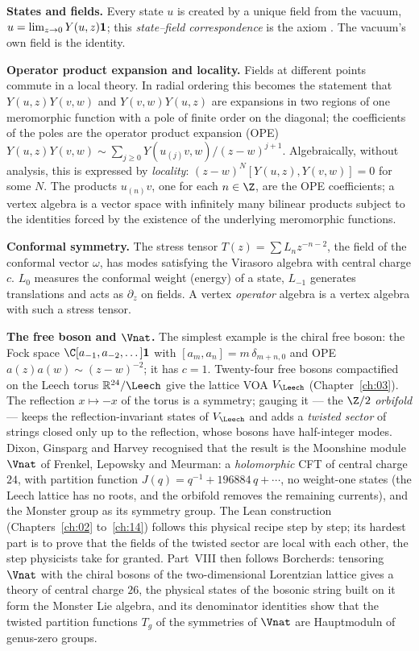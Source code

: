 \textbf{States and fields.} Every state $u$ is created by a unique field from the vacuum,
$u = \lim_{z\to0}Y(u,z)\mathbf{1}$; this \emph{state--field correspondence} is the axiom
. The vacuum's own field is the identity.

\textbf{Operator product expansion and locality.} Fields at different points commute in a local
theory. In radial ordering this becomes the statement that $Y(u,z)Y(v,w)$ and $Y(v,w)Y(u,z)$ are
expansions in two regions of one meromorphic function with a pole of finite order on the diagonal;
the coefficients of the poles are the operator product expansion (OPE)
$Y(u,z)Y(v,w)\sim\sum_{j\ge0}Y(u_{(j)}v,w)/(z-w)^{j+1}$. Algebraically, without analysis, this is
expressed by \emph{locality}: $(z-w)^N[Y(u,z),Y(v,w)] = 0$ for some $N$. The products $u_{(n)}v$,
one for each $n\in\Z$, are the OPE coefficients; a vertex algebra is a vector space with infinitely
many bilinear products subject to the identities forced by the existence of the underlying
meromorphic functions.

\textbf{Conformal symmetry.} The stress tensor $T(z) = \sum L_nz^{-n-2}$, the field of the conformal
vector $\omega$, has modes satisfying the Virasoro algebra with central charge $c$. $L_0$ measures
the conformal weight (energy) of a state, $L_{-1}$ generates translations and acts as $\partial_z$ on
fields. A vertex \emph{operator} algebra is a vertex algebra with such a stress tensor.

\textbf{The free boson and $\Vnat$.} The simplest example is the chiral free boson: the Fock space
$\C[a_{-1},a_{-2},\dots]\chonevac$ with $[a_m,a_n] = m\,\delta_{m+n,0}$ and OPE
$a(z)a(w)\sim(z-w)^{-2}$; it has $c=1$. Twenty-four free bosons compactified on the Leech torus
$\mathbb R^{24}/\Leech$ give the lattice VOA $V_\Leech$ (Chapter~\ref{ch:03}). The reflection
$x\mapsto -x$ of the torus is a symmetry; gauging it --- the $\Z/2$ \emph{orbifold} --- keeps the
reflection-invariant states of $V_\Leech$ and adds a \emph{twisted sector} of strings closed only up
to the reflection, whose bosons have half-integer modes. Dixon, Ginsparg and Harvey recognised that
the result is the Moonshine module $\Vnat$ of Frenkel, Lepowsky and Meurman: a \emph{holomorphic}
CFT of central charge $24$, with partition function $J(q) = q^{-1} + 196884\,q + \cdots$, no
weight-one states (the Leech lattice has no roots, and the orbifold removes the remaining currents),
and the Monster group as its symmetry group. The Lean construction (Chapters~\ref{ch:02}
to~\ref{ch:14}) follows this physical recipe step by step; its hardest part is to prove that the
fields of the twisted sector are local with each other, the step physicists take for granted.
Part~VIII then follows Borcherds: tensoring $\Vnat$ with the chiral bosons of the two-dimensional Lorentzian lattice
gives a theory of central charge $26$, the physical states of the bosonic string built on it form the Monster Lie
algebra, and its denominator identities show that the twisted partition functions $T_g$ of the symmetries of $\Vnat$
are Hauptmoduln of genus-zero groups.

